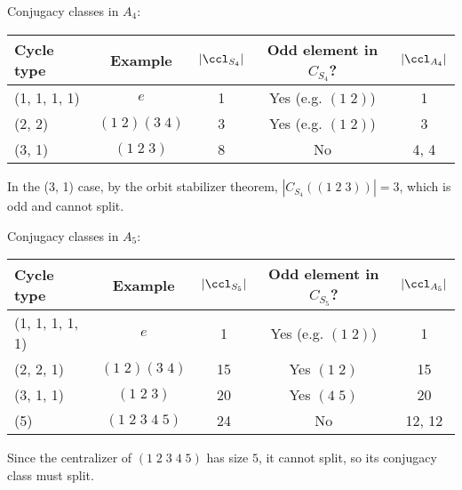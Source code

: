 \documentclass[a4pape]{article}
\begin{document}
\begin{eg}
  Conjugacy classes in $A_4$:\vspace{4pt}                                                         \\
  \begin{tabular}{lcccc}
    \toprule
    Cycle type   & Example          & $|\ccl_{S_4}|$ & Odd element in $C_{S_4}$? & $|\ccl_{A_4}|$ \\
    \midrule
    (1, 1, 1, 1) & $e$              & 1              & Yes (e.g. $(1\; 2)$)      & 1              \\
    (2, 2)       & $(1\; 2)(3\; 4)$ & 3              & Yes (e.g. $(1\; 2)$)      & 3              \\
    (3, 1)       & $(1\; 2\; 3)$    & 8              & No                        & 4, 4           \\
    \bottomrule
  \end{tabular}

  \vspace{4pt}
  \noindent In the (3, 1) case, by the orbit stabilizer theorem, $|C_{S_4}((1\; 2\; 3))| = 3$, which is odd and cannot split. 
\end{eg}

\begin{eg}
  Conjugacy classes in $A_5$:\vspace{4pt}                                                                 \\
  \begin{tabular}{lcccc}
    \toprule
    Cycle type      & Example               & $|\ccl_{S_5}|$ & Odd element in $C_{S_5}$? & $|\ccl_{A_5}|$ \\
    \midrule
    (1, 1, 1, 1, 1) & $e$                   & 1              & Yes (e.g. $(1\; 2)$)      & 1              \\
    (2, 2, 1)       & $(1\; 2)(3\; 4)$      & 15             & Yes $(1\; 2)$             & 15             \\
    (3, 1, 1)       & $(1\; 2\; 3)$         & 20             & Yes $(4\; 5)$             & 20             \\
    (5)             & $(1\; 2\; 3\; 4\; 5)$ & 24             & No                        & 12, 12         \\
    \bottomrule
  \end{tabular}

  Since the centralizer of $(1\; 2\; 3\; 4\; 5)$ has size $5$, it cannot split, so its conjugacy class must split.
\end{eg}
\end{document}
